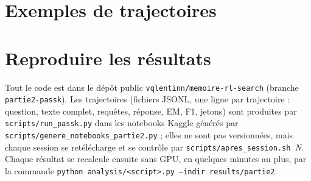 \section{Exemples de trajectoires}\label{ann:exemples}

\section{Reproduire les résultats}\label{ann:reproduire}
Tout le code est dans le dépôt public \texttt{vqlentinn/memoire-rl-search} (branche \texttt{partie2-passk}). Les trajectoires (fichiers JSONL, une ligne par trajectoire : question, texte complet, requêtes, réponse, EM, F1, jetons) sont produites par \texttt{scripts/run\_passk.py} dans les notebooks Kaggle générés par \texttt{scripts/genere\_notebooks\_partie2.py} ; elles ne sont pas versionnées, mais chaque session se retélécharge et se contrôle par \texttt{scripts/apres\_session.sh}~\textit{N}. Chaque résultat se recalcule ensuite sans GPU, en quelques minutes au plus, par la commande \texttt{python analysis/<script>.py --indir results/partie2}.

